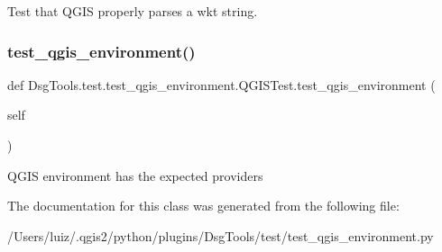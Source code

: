 \begin{DoxyVerb}Test that QGIS properly parses a wkt string.
\end{DoxyVerb}
 \mbox{\label{class_dsg_tools_1_1test_1_1test__qgis__environment_1_1_q_g_i_s_test_a1c1ff4f15c472f2a333cb5acbc96a24e}} 
\subsubsection{\texorpdfstring{test\+\_\+qgis\+\_\+environment()}{test\_qgis\_environment()}}
{\footnotesize\ttfamily def Dsg\+Tools.\+test.\+test\+\_\+qgis\+\_\+environment.\+Q\+G\+I\+S\+Test.\+test\+\_\+qgis\+\_\+environment (\begin{DoxyParamCaption}\item[{}]{self }\end{DoxyParamCaption})}

\begin{DoxyVerb}QGIS environment has the expected providers\end{DoxyVerb}
 

The documentation for this class was generated from the following file\+:\begin{DoxyCompactItemize}
\item 
/\+Users/luiz/.\+qgis2/python/plugins/\+Dsg\+Tools/test/test\+\_\+qgis\+\_\+environment.\+py\end{DoxyCompactItemize}
